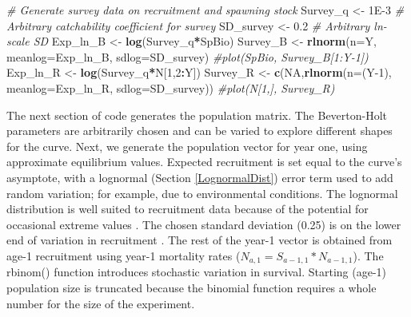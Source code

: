 \documentclass[
]{krantz}
\makeatletter
\newenvironment{Shaded}{\begin{snugshade}}{\end{snugshade}}
\newcommand{\AttributeTok}[1]{\textcolor[rgb]{0.27,0.27,0.27}{#1}}
\newcommand{\CommentTok}[1]{\textcolor[rgb]{0.37,0.37,0.37}{\textit{#1}}}
\newcommand{\ConstantTok}[1]{\textcolor[rgb]{0.37,0.37,0.37}{#1}}
\newcommand{\DecValTok}[1]{\textcolor[rgb]{0.06,0.06,0.06}{#1}}
\newcommand{\FloatTok}[1]{\textcolor[rgb]{0.06,0.06,0.06}{#1}}
\newcommand{\FunctionTok}[1]{\textcolor[rgb]{0.27,0.27,0.27}{\textbf{#1}}}
\newcommand{\NormalTok}[1]{#1}
\newcommand{\OtherTok}[1]{\textcolor[rgb]{0.37,0.37,0.37}{#1}}
\newcommand{\SpecialCharTok}[1]{\textcolor[rgb]{0.43,0.43,0.43}{\textbf{#1}}}
\newenvironment{kframe}{%
\medskip{}
\setlength{\fboxsep}{.8em}
 \def\at@end@of@kframe{}%
 \ifinner\ifhmode%
  \def\at@end@of@kframe{\end{minipage}}%
  \begin{minipage}{\columnwidth}%
 \fi\fi%
 \def\FrameCommand##1{\hskip\@totalleftmargin \hskip-\fboxsep
 \colorbox{shadecolor}{##1}\hskip-\fboxsep
     \hskip-\linewidth \hskip-\@totalleftmargin \hskip\columnwidth}%
 \MakeFramed {\advance\hsize-\width
   \@totalleftmargin\z@ \linewidth\hsize
   \@setminipage}}%
 {\par\unskip\endMakeFramed%
 \at@end@of@kframe}
\renewenvironment{Shaded}{\begin{kframe}}{\end{kframe}}
\makeatother
\begin{document}
\begin{Shaded}
\begin{Highlighting}[]
\CommentTok{\# Generate survey data on recruitment and spawning stock}
\NormalTok{Survey\_q }\OtherTok{\textless{}{-}} \FloatTok{1E{-}3} \CommentTok{\# Arbitrary catchability coefficient for survey}
\NormalTok{SD\_survey }\OtherTok{\textless{}{-}} \FloatTok{0.2} \CommentTok{\# Arbitrary ln{-}scale SD}
\NormalTok{Exp\_ln\_B }\OtherTok{\textless{}{-}} \FunctionTok{log}\NormalTok{(Survey\_q}\SpecialCharTok{*}\NormalTok{SpBio)}
\NormalTok{Survey\_B }\OtherTok{\textless{}{-}} \FunctionTok{rlnorm}\NormalTok{(}\AttributeTok{n=}\NormalTok{Y, }\AttributeTok{meanlog=}\NormalTok{Exp\_ln\_B, }\AttributeTok{sdlog=}\NormalTok{SD\_survey)}
\CommentTok{\#plot(SpBio, Survey\_B[1:Y{-}1])}
\NormalTok{Exp\_ln\_R }\OtherTok{\textless{}{-}} \FunctionTok{log}\NormalTok{(Survey\_q}\SpecialCharTok{*}\NormalTok{N[}\DecValTok{1}\NormalTok{,}\DecValTok{2}\SpecialCharTok{:}\NormalTok{Y])}
\NormalTok{Survey\_R }\OtherTok{\textless{}{-}} \FunctionTok{c}\NormalTok{(}\ConstantTok{NA}\NormalTok{,}\FunctionTok{rlnorm}\NormalTok{(}\AttributeTok{n=}\NormalTok{(Y}\DecValTok{{-}1}\NormalTok{), }\AttributeTok{meanlog=}\NormalTok{Exp\_ln\_R, }\AttributeTok{sdlog=}\NormalTok{SD\_survey))}
\CommentTok{\#plot(N[1,], Survey\_R)}
\end{Highlighting}
\end{Shaded}

The next section of code generates the population matrix. The Beverton-Holt parameters are arbitrarily chosen and can be varied to explore different shapes for the curve. Next, we generate the population vector for year one, using approximate equilibrium values. Expected recruitment is set equal to the curve's asymptote, with a lognormal (Section \ref{LognormalDist}) error term used to add random variation; for example, due to environmental conditions. The lognormal distribution is well suited to recruitment data because of the potential for occasional extreme values \citep{hilborn.walters_1992}. The chosen standard deviation (0.25) is on the lower end of variation in recruitment \citep{hightower.grossman_1985}. The rest of the year-1 vector is obtained from age-1 recruitment using year-1 mortality rates (\(N_{a,1}=S_{a-1,1}*N_{a-1,1}\)). The rbinom() function introduces stochastic variation in survival. Starting (age-1) population size is truncated because the binomial function requires a whole number for the size of the experiment.
\end{document}
